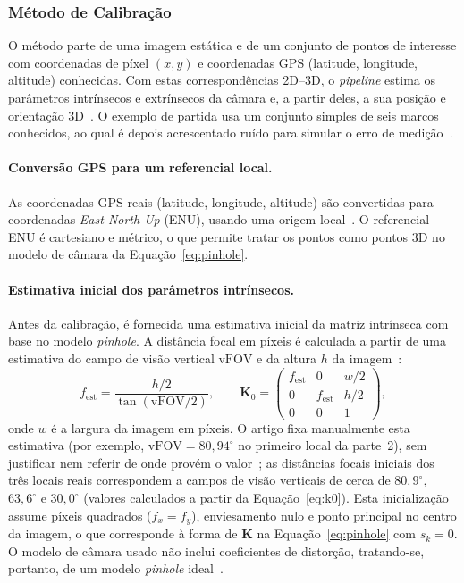 \subsubsection{Método de Calibração}
\label{sec:sunkara_metodo}

O método parte de uma imagem estática e de um conjunto de pontos de interesse com coordenadas de píxel $(x, y)$ e coordenadas GPS (latitude, longitude, altitude) conhecidas. Com estas correspondências 2D--3D, o \textit{pipeline} estima os parâmetros intrínsecos e extrínsecos da câmara e, a partir deles, a sua posição e orientação 3D~\cite{sunkara2025}. O exemplo de partida usa um conjunto simples de seis marcos conhecidos, ao qual é depois acrescentado ruído para simular o erro de medição~\cite{sunkara2025}.

\paragraph{Conversão GPS para um referencial local.} As coordenadas GPS reais (latitude, longitude, altitude) são convertidas para coordenadas \textit{East-North-Up} (ENU), usando uma origem local~\cite{sunkara2025}. O referencial ENU é cartesiano e métrico, o que permite tratar os pontos como pontos 3D no modelo de câmara da Equação~\eqref{eq:pinhole}.

\paragraph{Estimativa inicial dos parâmetros intrínsecos.} Antes da calibração, é fornecida uma estimativa inicial da matriz intrínseca com base no modelo \textit{pinhole}. A distância focal em píxeis é calculada a partir de uma estimativa do campo de visão vertical $\mathrm{vFOV}$ e da altura $h$ da imagem~\cite{sunkara2025}:
\begin{equation}
    f_{\mathrm{est}}=\frac{h/2}{\tan\!\left(\mathrm{vFOV}/2\right)},
    \qquad
    \mathbf{K}_0=
    \begin{pmatrix}
        f_{\mathrm{est}} & 0 & w/2\\
        0 & f_{\mathrm{est}} & h/2\\
        0 & 0 & 1
    \end{pmatrix},
    \label{eq:k0}
\end{equation}
onde $w$ é a largura da imagem em píxeis. O artigo fixa manualmente esta estimativa (por exemplo, $\mathrm{vFOV}=80{,}94^{\circ}$ no primeiro local da parte~2), sem justificar nem referir de onde provém o valor~\cite{sunkara2025}; as distâncias focais iniciais dos três locais reais correspondem a campos de visão verticais de cerca de $80{,}9^{\circ}$, $63{,}6^{\circ}$ e $30{,}0^{\circ}$ (valores calculados a partir da Equação~\eqref{eq:k0}). Esta inicialização assume píxeis quadrados ($f_x=f_y$), enviesamento nulo e ponto principal no centro da imagem, o que corresponde à forma de $\mathbf{K}$ na Equação~\eqref{eq:pinhole} com $s_k=0$. O modelo de câmara usado não inclui coeficientes de distorção, tratando-se, portanto, de um modelo \textit{pinhole} ideal~\cite{sunkara2025}.

